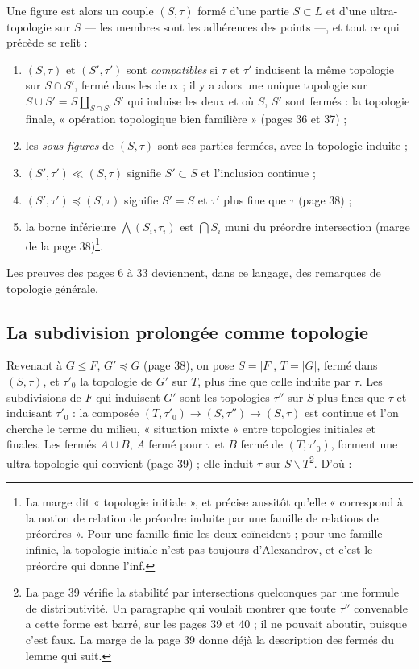 \documentclass[11pt,a4paper]{article}
\begin{document}
Une figure est alors un couple $(S, \tau)$ formé d'une partie $S \subset L$ et
d'une ultra-topologie sur $S$ --- les membres sont les adhérences des points ---,
et tout ce qui précède se relit :
\begin{enumerate}
\item[--] $(S, \tau)$ et $(S', \tau')$ sont \emph{compatibles} si $\tau$ et $\tau'$
induisent la même topologie sur $S \cap S'$, fermé dans les deux ; il y a alors
une unique topologie sur $S \cup S' = S \amalg_{S \cap S'} S'$ qui induise les
deux et où $S$, $S'$ sont fermés : la topologie finale, « opération
topologique bien familière » (pages 36 et 37) ;
\item[--] les \emph{sous-figures} de $(S, \tau)$ sont ses parties fermées, avec la
topologie induite ;
\item[--] $(S', \tau') \ll (S, \tau)$ signifie $S' \subset S$ et l'inclusion
continue ;
\item[--] $(S', \tau') \preccurlyeq (S, \tau)$ signifie $S' = S$ et $\tau'$ plus fine
que $\tau$ (page 38) ;
\item[--] la borne inférieure $\bigwedge (S_{i}, \tau_{i})$ est $\bigcap S_{i}$ muni
du préordre intersection (marge de la page 38)\footnote{La marge dit
« topologie initiale », et précise aussitôt qu'elle « correspond à la notion de
relation de préordre induite par une famille de relations de préordres ». Pour
une famille finie les deux coïncident ; pour une famille infinie, la topologie
initiale n'est pas toujours d'Alexandrov, et c'est le préordre qui donne
l'inf.}.
\end{enumerate}
Les preuves des pages 6 à 33 deviennent, dans ce langage, des remarques de
topologie générale.

\subsection*{La subdivision prolongée comme topologie}

Revenant à $G \leq F$, $G' \preccurlyeq G$ (page 38), on pose $S = |F|$, $T =
|G|$, fermé dans $(S, \tau)$, et $\tau'_{0}$ la topologie de $G'$ sur $T$, plus
fine que celle induite par $\tau$. Les subdivisions de $F$ qui induisent $G'$
sont les topologies $\tau''$ sur $S$ plus fines que $\tau$ et induisant
$\tau'_{0}$ : la composée $(T, \tau'_{0}) \to (S, \tau'') \to (S, \tau)$ est
continue et l'on cherche le terme du milieu, « situation mixte » entre
topologies initiales et finales. Les fermés $A \cup B$, $A$ fermé pour $\tau$
et $B$ fermé de $(T, \tau'_{0})$, forment une ultra-topologie qui convient
(page 39) ; elle induit $\tau$ sur $S \smallsetminus T$\footnote{La page 39
vérifie la stabilité par intersections quelconques par une formule de
distributivité. Un paragraphe qui voulait montrer que toute $\tau''$ convenable
a cette forme est barré, sur les pages 39 et 40 ; il ne pouvait aboutir,
puisque c'est faux. La marge de la page 39 donne déjà la description des
fermés du lemme qui suit.}. D'où :
\end{document}

